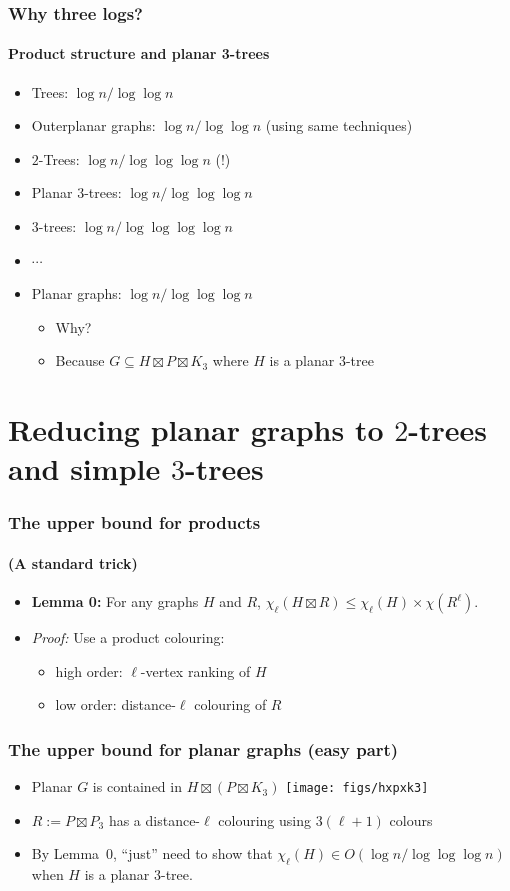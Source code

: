 \documentclass[xcolor=dvipsnames]{beamer}
\begin{document}
\begin{frame}
  \frametitle{Why three logs?}
  \framesubtitle{Product structure and planar 3-trees}
  \begin{itemize}[<+->]
    \item Trees: $\log n/\log\log n$
    \item Outerplanar graphs: $\log n/\log\log n$ (using same techniques)
    \item $2$-Trees: $\log n/\log\log\log n$ \alert{(!)}
    \item Planar $3$-trees: $\log n/\log\log\log n$
    \item $3$-trees: $\log n/\log\log\log\log n$
    \item[]$\cdots$
    \item Planar graphs: $\log n/\log\log\log n$
    \begin{itemize}[<+->]
      \item Why?
      \item Because $G\subseteq H\boxtimes P\boxtimes K_3$ where $H$ is a planar 3-tree
    \end{itemize}
  \end{itemize}
\end{frame}

\section{Reducing planar graphs to $2$-trees and simple $3$-trees}

\begin{frame}
  \frametitle{The upper bound for products}
  \framesubtitle{(A standard trick)}

  \begin{itemize}
    \item \textbf{Lemma 0:} For any graphs $H$ and $R$, $\chi_\ell(H\boxtimes R) \le \chi_\ell(H)\times \chi(R^\ell)$.
    \item[] \textit{Proof:} Use a product colouring:
    \begin{itemize}
      \item high order: $\ell$-vertex ranking of $H$
      \item low order: distance-$\ell$ colouring of $R$
    \end{itemize}
  \end{itemize}
\end{frame}

\begin{frame}
  \frametitle{The upper bound for planar graphs (easy part)}
  \begin{itemize}
    \item Planar $G$ is contained in $H\boxtimes (P\boxtimes K_3)$
    \texttt{[image: figs/hxpxk3]}
    \item $R:=P\boxtimes P_3$ has a distance-$\ell$ colouring using $3(\ell+1)$ colours
    \item By Lemma~0, ``just'' need to show that $\chi_\ell(H)\in O(\log n/\log\log\log n)$ when $H$ is a planar $3$-tree.
  \end{itemize}
\end{frame}
\end{document}
